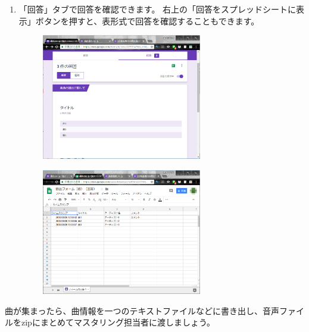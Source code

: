 \documentclass[11pt,a4paper]{jsarticle}
\begin{document}
\begin{enumerate}
                \item 「回答」タブで回答を確認できます。
                    右上の「回答をスプレッドシートに表示」ボタンを押すと、表形式で回答を確認することもできます。
                    \begin{figure}[htbp]
                        \begin{minipage}{0.5\hsize}
                         \begin{center}
                          \includegraphics[width=70mm]{./form05.eps}
                         \end{center}
                         \label{fig:form05}
                        \end{minipage}
                        \begin{minipage}{0.5\hsize}
                         \begin{center}
                          \includegraphics[width=70mm]{./form06.eps}
                         \end{center}
                         \label{fig:form06}
                        \end{minipage}
                    \end{figure}

                \end{enumerate}

            曲が集まったら、曲情報を一つのテキストファイルなどに書き出し、音声ファイルをzipにまとめてマスタリング担当者に渡しましょう。
        
\end{document}
